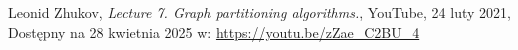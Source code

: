 \documentclass{article}
\begin{document}
    

\begin{thebibliography}{9}

Leonid Zhukov, \textit{Lecture 7. Graph partitioning algorithms.}, YouTube, 24 luty 2021, Dostępny na 28 kwietnia 2025 w: \url{https://youtu.be/zZae_C2BU_4}

\end{thebibliography}
\end{document}
